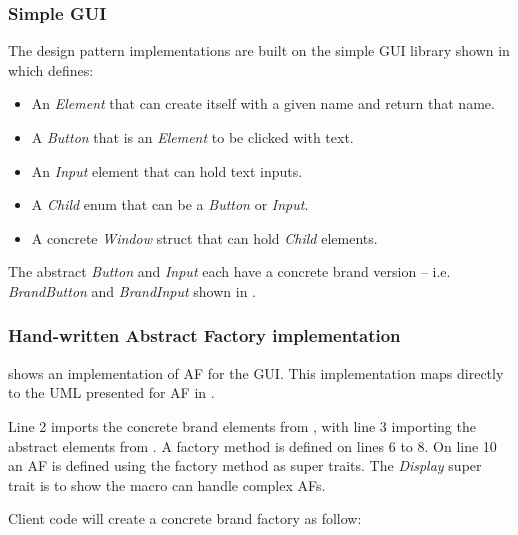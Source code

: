 \subsubsection{Simple GUI}
The design pattern implementations are built on the simple GUI library shown in  which defines:

\begin{itemize}
	\item An \textit{Element} that can create itself with a given name and return that name.
	\item A \textit{Button} that is an \textit{Element} to be clicked with text.
	\item An \textit{Input} element that can hold text inputs.
	\item A \textit{Child} enum that can be a \textit{Button} or \textit{Input}.
	\item A concrete \textit{Window} struct that can hold \textit{Child} elements.
\end{itemize}


The abstract \textit{Button} and \textit{Input} each have a concrete brand version -- i.e. \textit{BrandButton} and \textit{BrandInput} shown in .


\subsubsection{Hand-written Abstract Factory implementation}
 shows an implementation of AF for the GUI.
This implementation maps directly to the UML presented for AF in .


Line 2 imports the concrete brand elements from , with line 3 importing the abstract elements from .
A factory method is defined on lines 6 to 8.
On line 10 an AF is defined using the factory method as super traits.
The \textit{Display} super trait is to show the macro can handle complex AFs.

Client code will create a concrete brand factory as follow:

